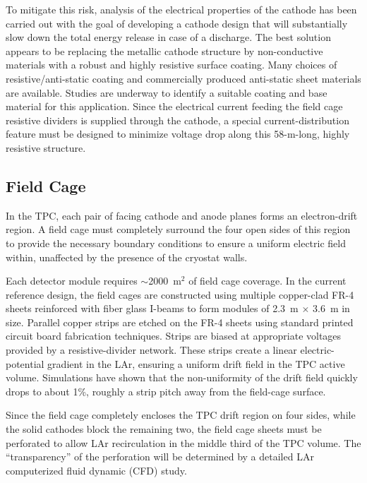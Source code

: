 To mitigate this risk, analysis of the electrical properties of the
cathode has been carried out with the goal of developing a cathode
design that will substantially slow down the total energy release in
case of a discharge.  The best solution appears to be replacing the
metallic cathode structure by non-conductive materials with a robust
and highly resistive surface coating.  Many choices of 
resistive/anti-static coating and commercially produced
anti-static sheet materials are available.  Studies are underway to identify a
suitable coating and base material for this application.  Since the
electrical current feeding the field cage resistive dividers is
supplied through the cathode, a special current-distribution feature
must be designed to minimize voltage drop along this 58-m-long, highly
resistive structure.


\subsection{Field Cage}
\label{subsec:fd-ref-fieldcage}

In the TPC, each pair of facing cathode and anode planes forms an
electron-drift region. A field cage must completely surround the four
open sides of this region to provide the necessary boundary conditions
to ensure a uniform electric field within, unaffected by the presence
of the cryostat walls.


Each  detector module requires $\sim$2000~m$^2$ of field
cage coverage. In the current reference design, the field cages are
constructed using multiple copper-clad FR-4 sheets reinforced with
fiber glass I-beams to form modules of 2.3~m $\times$ 3.6~m in
size. Parallel copper strips are etched on the FR-4 sheets using
standard printed circuit board fabrication techniques. Strips are
biased at appropriate voltages provided by a resistive-divider 
network. These strips create a linear electric-potential gradient in
the LAr, ensuring a uniform drift field in the TPC active volume. 
Simulations have shown that the non-uniformity of the drift field quickly
drops to about 1\%, roughly a strip pitch away from the field-cage
surface.

Since the field cage completely encloses the TPC drift region on four
sides, while the solid cathodes block the remaining two, the field
cage sheets must be perforated to allow LAr recirculation in
the middle third of the TPC volume. The ``transparency'' of the
perforation will be determined by a detailed LAr computerized fluid
dynamic (CFD) study.

